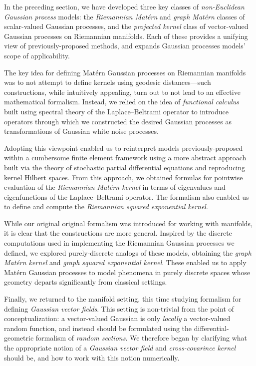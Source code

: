 \documentclass[11pt]{book}
\begin{document}
In the preceding section, we have developed three key classes of \emph{non-Euclidean Gaussian process} models: the \emph{Riemannian Matérn} and \emph{graph Matérn} classes of scalar-valued Gaussian processes, and the \emph{projected kernel} class of vector-valued Gaussian processes on Riemannian manifolds.
Each of these provides a unifying view of previously-proposed methods, and expands Gaussian processes models' scope of applicability.

The key idea for defining Matérn Gaussian processes on Riemannian manifolds was to not attempt to define kernels using geodesic distances---such constructions, while intuitively appealing, turn out to not lead to an effective mathematical formalism.
Instead, we relied on the idea of \emph{functional calculus} built using spectral theory of the Laplace--Beltrami operator to introduce operators through which we constructed the desired Gaussian processes as transformations of Gaussian white noise processes.

Adopting this viewpoint enabled us to reinterpret models previously-proposed within a cumbersome finite element framework using a more abstract approach built via the theory of stochastic partial differential equations and reproducing kernel Hilbert spaces.
From this approach, we obtained formulas for pointwise evaluation of the \emph{Riemannian Matérn kernel} in terms of eigenvalues and eigenfunctions of the Laplace--Beltrami operator.
The formalism also enabled us to define and compute the \emph{Riemannian squared exponential kernel}.

While our original original formalism was introduced for working with manifolds, it is clear that the constructions are more general.
Inspired by the discrete computations used in implementing the Riemannian Gaussian processes we defined, we explored purely-discrete analogs of these models, obtaining the \emph{graph Matérn kernel} and \emph{graph squared exponential kernel}.
These enabled us to apply Matérn Gaussian processes to model phenomena in purely discrete spaces whose geometry departs significantly from classical settings.

Finally, we returned to the manifold setting, this time studying formalism for defining \emph{Gaussian vector fields}.
This setting is non-trivial from the point of conceptualization: a vector-valued Gaussian is only \emph{locally} a vector-valued random function, and instead should be formulated using the differential-geometric formalism of \emph{random sections}.
We therefore began by clarifying what the appropriate notion of a \emph{Gaussian vector field}  and \emph{cross-covarince kernel} should be, and how to work with this notion numerically.
\end{document}
